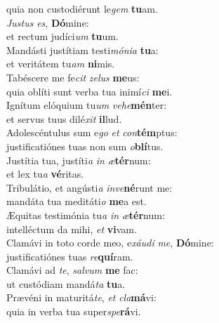 \evenverse quia non custodiérunt le\textit{gem} \textbf{tu}am.\\
\oddverse \textit{Ju}\textit{stus} \textit{es}, \textbf{Dó}mine:~\*\\
\oddverse et rectum judíci\textit{um} \textbf{tu}um.\\
\evenverse Mandásti justítiam testi\textit{mó}\textit{ni}\textit{a} \textbf{tu}a:~\*\\
\evenverse et veritátem tu\textit{am} \textbf{ni}mis.\\
\oddverse Tabéscere me fe\textit{cit} \textit{ze}\textit{lus} \textbf{me}us:~\*\\
\oddverse quia oblíti sunt verba tua inimí\textit{ci} \textbf{me}i.\\
\evenverse Ignítum elóquium tu\textit{um} \textit{ve}\textit{he}\textbf{mén}ter:~\*\\
\evenverse et servus tuus dilé\textit{xit} \textbf{il}lud.\\
\oddverse Adolescéntulus sum e\textit{go} \textit{et} \textit{con}\textbf{tém}ptus:~\*\\
\oddverse justificatiónes tuas non sum \textit{o}\textbf{blí}tus.\\
\evenverse Justítia tua, justíti\textit{a} \textit{in} \textit{æ}\textbf{tér}num:~\*\\
\evenverse et lex tu\textit{a} \textbf{vé}ritas.\\
\oddverse Tribulátio, et angústi\textit{a} \textit{in}\textit{ve}\textbf{né}runt me:~\*\\
\oddverse mandáta tua meditáti\textit{o} \textbf{me}a est.\\
\evenverse Æquitas testimónia tu\textit{a} \textit{in} \textit{æ}\textbf{tér}num:~\*\\
\evenverse intelléctum da mihi, \textit{et} \textbf{vi}vam.\\
\oddverse Clamávi in toto corde meo, e\textit{xáu}\textit{di} \textit{me}, \textbf{Dó}mine:~\*\\
\oddverse justificatiónes tuas \textit{re}\textbf{quí}ram.\\
\evenverse Clamávi ad \textit{te}, \textit{sal}\textit{vum} \textbf{me} fac:~\*\\
\evenverse ut custódiam mandá\textit{ta} \textbf{tu}a.\\
\oddverse Prævéni in maturitá\textit{te}, \textit{et} \textit{cla}\textbf{má}vi:~\*\\
\oddverse quia in verba tua super\textit{spe}\textbf{rá}vi.\\
